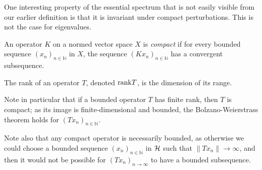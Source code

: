 \documentclass[../main.tex]{subfiles}
\begin{document}
One interesting property of the essential spectrum that is not easily visible
from our earlier definition is that it is invariant under compact perturbations.
This is not the case for eigenvalues.

\begin{definition}
  An operator $K$ on a normed vector space $X$ is \emph{compact} if for every
  bounded sequence $(x_n)_{n \in \mathbb{N}}$ in $X$, the sequence
  $(Kx_n)_{n \in \mathbb{N}}$ has a convergent subsequence.

  The rank of an operator $T$, denoted $\mathrm{rank} T$, is the dimension of its range.
\end{definition}

Note in particular that if a bounded operator $T$ has finite rank, then $T$ is
compact; as its image is finite-dimensional and bounded, the Bolzano-Weierstrass
theorem holds for $(Tx_n)_{n \in \mathbb{N}}$.

Note also that any compact operator is necessarily bounded, as otherwise we
could choose a bounded sequence $(x_n)_{n \in \mathbb{N}}$ in $\mathcal{H}$ such
that $\|Tx_n\| \rightarrow \infty$, and then it would not be possible for
$(Tx_n)_{n \rightarrow \infty}$ to have a bounded subsequence. 
\end{document}
